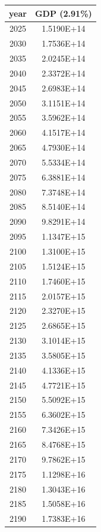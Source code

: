 \documentclass[a4paper]{article}
\begin{document}
	\noindent
	\begin{tabular}{|c|c|}
		\hline
		year & GDP (2.91\%) \\
		\hline
		2025 & 1.5190E+14 \\
		\hline
		2030 & 1.7536E+14 \\
		\hline
		2035 & 2.0245E+14 \\
		\hline
		2040 & 2.3372E+14 \\
		\hline
		2045 & 2.6983E+14 \\
		\hline
		2050 & 3.1151E+14 \\
		\hline
		2055 & 3.5962E+14 \\
		\hline
		2060 & 4.1517E+14 \\
		\hline
		2065 & 4.7930E+14 \\
		\hline
		2070 & 5.5334E+14 \\
		\hline
		2075 & 6.3881E+14 \\
		\hline
		2080 & 7.3748E+14 \\
		\hline
		2085 & 8.5140E+14 \\
		\hline
		2090 & 9.8291E+14 \\
		\hline
		2095 & 1.1347E+15 \\
		\hline
		2100 & 1.3100E+15 \\
		\hline
		2105 & 1.5124E+15 \\
		\hline
		2110 & 1.7460E+15 \\
		\hline
		2115 & 2.0157E+15 \\
		\hline
		2120 & 2.3270E+15 \\
		\hline
		2125 & 2.6865E+15 \\
		\hline
		2130 & 3.1014E+15 \\
		\hline
		2135 & 3.5805E+15 \\
		\hline
		2140 & 4.1336E+15 \\
		\hline
		2145 & 4.7721E+15 \\
		\hline
		2150 & 5.5092E+15 \\
		\hline
		2155 & 6.3602E+15 \\
		\hline
		2160 & 7.3426E+15 \\
		\hline
		2165 & 8.4768E+15 \\
		\hline
		2170 & 9.7862E+15 \\
		\hline
		2175 & 1.1298E+16 \\
		\hline
		2180 & 1.3043E+16 \\
		\hline
		2185 & 1.5058E+16 \\
		\hline
		2190 & 1.7383E+16 \\
		\hline

\end{tabular}
\end{document}
